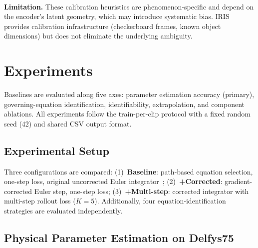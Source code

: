\documentclass[runningheads]{llncs}
\begin{document}
\\
\noindent
\textbf{Limitation.} These calibration heuristics are phenomenon-specific and depend on the encoder's latent geometry, which may introduce systematic bias. IRIS provides calibration infrastructure (checkerboard frames, known object dimensions) but does not eliminate the underlying ambiguity. 


\section{Experiments}
\label{sec:experiments}

Baselines are evaluated along five axes: parameter estimation accuracy (primary), governing-equation identification, identifiability, extrapolation, and component ablations. All experiments follow the train-per-clip protocol with a fixed random seed (42) and shared CSV output format.

\subsection{Experimental Setup}
\label{sec:exp_setup}

Three configurations are compared: (1)~\textbf{Baseline}: path-based equation selection, one-step loss, original uncorrected Euler integrator~\cite{garcia2025learning}; (2)~\textbf{+Corrected}: gradient-corrected Euler step, one-step loss; (3)~\textbf{+Multi-step}: corrected integrator with multi-step rollout loss ($K{=}5$). Additionally, four equation-identification strategies are evaluated independently.

\subsection{Physical Parameter Estimation on Delfys75}
\label{sec:exp_delfys}
\end{document}
